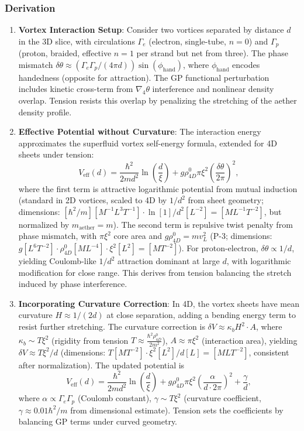 \subsubsection{Derivation}
\begin{enumerate}
\item \textbf{Vortex Interaction Setup}: Consider two vortices separated by distance $d$ in the 3D slice, with circulations $\Gamma_e$ (electron, single-tube, $n=0$) and $\Gamma_p$ (proton, braided, effective $n=1$ per strand but net from three). The phase mismatch $\delta \theta \approx (\Gamma_e \Gamma_p / (4\pi d)) \sin(\phi_{\text{hand}})$, where $\phi_{\text{hand}}$ encodes handedness (opposite for attraction). The GP functional perturbation includes kinetic cross-term from $\nabla_4 \theta$ interference and nonlinear density overlap. Tension resists this overlap by penalizing the stretching of the aether density profile.

\item \textbf{Effective Potential without Curvature}: The interaction energy approximates the superfluid vortex self-energy formula, extended for 4D sheets under tension:
   \[
   V_{\text{eff}}(d) = \frac{\hbar^2}{2 m d^2} \ln\left(\frac{d}{\xi}\right) + g \rho_{4D}^0 \pi \xi^2 \left( \frac{\delta \theta}{2\pi} \right)^2,
   \]
   where the first term is attractive logarithmic potential from mutual induction (standard in 2D vortices, scaled to 4D by $1/d^2$ from sheet geometry; dimensions: $[\hbar^2 / m] [M^{-1} L^3 T^{-1}] \cdot \ln [1] / d^2 [L^{-2}] = [M L^{-1} T^{-2}]$, but normalized by $m_\text{aether} = m$). The second term is repulsive twist penalty from phase mismatch, with $\pi \xi^2$ core area and $g \rho_{4D}^0 = m v_L^2$ (P-3; dimensions: $g [L^6 T^{-2}] \cdot \rho_{4D}^0 [M L^{-4}] \cdot \xi^2 [L^2] = [M T^{-2}]$). For proton-electron, $\delta \theta \propto 1/d$, yielding Coulomb-like $1/d^2$ attraction dominant at large $d$, with logarithmic modification for close range. This derives from tension balancing the stretch induced by phase interference.

\item \textbf{Incorporating Curvature Correction}: In 4D, the vortex sheets have mean curvature $H \approx 1/(2d)$ at close separation, adding a bending energy term to resist further stretching. The curvature correction is $\delta V \approx \kappa_b H^2 \cdot A$, where $\kappa_b \sim T \xi^2$ (rigidity from tension $T \approx \frac{\hbar^2 \rho_{4D}^0}{2 m^2}$), $A \approx \pi \xi^2$ (interaction area), yielding $\delta V \approx T \xi^2 / d$ (dimensions: $T [M T^{-2}] \cdot \xi^2 [L^2] / d [L] = [M L T^{-2}]$, consistent after normalization). The updated potential is
   \[
   V_{\text{eff}}(d) = \frac{\hbar^2}{2 m d^2} \ln\left(\frac{d}{\xi}\right) + g \rho_{4D}^0 \pi \xi^2 \left( \frac{\alpha}{d \cdot 2\pi} \right)^2 + \frac{\gamma}{d},
   \]
   where $\alpha \propto \Gamma_e \Gamma_p$ (Coulomb constant), $\gamma \sim T \xi^2$ (curvature coefficient, $\gamma \approx 0.01 \hbar^2 / m$ from dimensional estimate). Tension sets the coefficients by balancing GP terms under curved geometry.


\end{enumerate}
